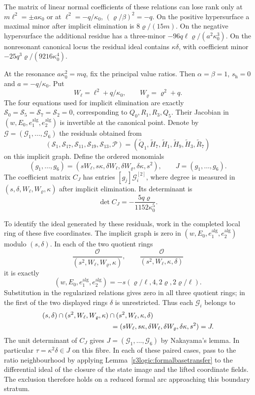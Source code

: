 \documentclass[11pt,a4paper]{article}
\numberwithin{equation}{section}
\theoremstyle{plain}
\theoremstyle{definition}
\theoremstyle{remark}
\begin{document}
The matrix of linear normal coefficients of these relations can lose rank
only at $m\ell^2=\pm a\kappa_0$ or at
$\ell^2=-q/\kappa_0$, $(\varrho/\beta)^2=-q$.
On the positive hypersurface a maximal minor after implicit elimination
is $8\varrho/(15m)$. On the negative hypersurface the additional residue
has a three-minor $-96q\ell\varrho/(a^2\kappa_0^3)$.
On the nonresonant canonical locus the residual ideal contains
$\kappa\delta$, with coefficient minor
$-25q^3\varrho/(9216\kappa_0^4)$.

At the resonance $a\kappa_0^2=mq$, fix the principal value ratios. Then
$\alpha=\beta=1$, $s_{\mathrm h}=0$ and $a=-q/\kappa_0$.
Put
\[
 W_\ell=\ell^2+q/\kappa_0,\qquad W_\varrho=\varrho^2+q.
\]
The four equations used for implicit elimination are exactly
$\mathcal S_0=\mathcal S_5=\mathcal S_7=\mathcal S_2=0$,
corresponding to $Q_0,R_1,R_3,Q_5$. Their Jacobian in
$(w,E_0,e_1^{\mathrm{alg}},e_2^{\mathrm{alg}})$ is invertible at the canonical point.
Denote by $\boldsymbol{\mathcal G}=(\mathcal G_1,\ldots,\mathcal G_6)$ the residuals obtained from
\[
 (\mathcal S_1,\mathcal S_{17},\mathcal S_{11},
      \mathcal S_{19},\mathcal S_{13},\mathcal P)
       =(\widetilde Q_1,\widetilde H_7,\widetilde H_1,
                   \widetilde H_9,\widetilde H_3,\widetilde R_7)
\]
on this implicit graph. Define the ordered monomials
\[
 (g_1,\ldots,g_6)
       =(sW_\ell,s\kappa,\delta W_\ell,\delta W_\varrho,
                         \delta\kappa,s^2),\qquad J=(g_1,\ldots,g_6).
\]
The coefficient matrix $C_J$ has entries $[g_j]\mathcal G_i^{[2]}$,
where degree is measured in $(s,\delta,W_\ell,W_\varrho,\kappa)$ after
implicit elimination. Its determinant is
\[
 \det C_J=-\frac{5q\varrho}{1152\kappa_0^5}.
\]

To identify the ideal generated by these residuals, work in the completed local
ring of these five coordinates. The implicit graph is zero in
$(w,E_0,e_1^{\mathrm{alg}},e_2^{\mathrm{alg}})$ modulo $(s,\delta)$. In each of the two quotient rings
\[
 \frac{\mathcal O}{(s^2,W_\ell,W_\varrho,\kappa)},\qquad
 \frac{\mathcal O}{(s^2,W_\ell,\kappa,\delta)}
\]
it is exactly
\[
 (w,E_0,e_1^{\mathrm{alg}},e_2^{\mathrm{alg}})=-s(\varrho/\ell,4,2\varrho,2\varrho/\ell).
\]
Substitution in the regularized relations gives zero in all
three quotient rings; in the first of the two displayed rings $\delta$
is unrestricted. Thus each $\mathcal G_i$ belongs to
\[
 \begin{aligned}
 &(s,\delta)\cap(s^2,W_\ell,W_\varrho,\kappa)
                  \cap(s^2,W_\ell,\kappa,\delta)\\
 &\hspace{35mm}=(sW_\ell,s\kappa,\delta W_\ell,
                 \delta W_\varrho,\delta\kappa,s^2)=J.
 \end{aligned}
\]
The unit determinant of $C_J$ gives
$J=(\mathcal G_1,\ldots,\mathcal G_6)$ by Nakayama's lemma.
In particular $\tau=\kappa^2\delta\in J$ on this fibre.
In each of these paired cases, pass to the ratio neighbourhood by applying
Lemma~\ref{r3logic:formalbasetransfer} to the differential ideal of the closure of the state image and the lifted coordinate fields.
The exclusion therefore holds on a reduced formal arc approaching
this boundary stratum.
\end{document}

